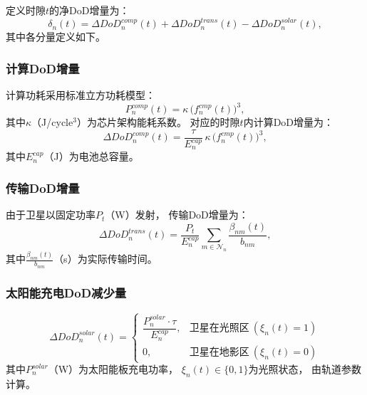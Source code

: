 \documentclass[a4paper,11pt]{article}
\begin{document}
定义时隙$t$的净DoD增量为：
\begin{equation}
    \delta_n(t) = \Delta DoD^{comp}_n(t)
    + \Delta DoD^{trans}_n(t)
    - \Delta DoD^{solar}_n(t),
    \label{eq:delta_dod}
\end{equation}
其中各分量定义如下。

\subsubsection{计算DoD增量}

计算功耗采用标准立方功耗模型\cite{zhang2024mhspo}：
\begin{equation}
    P^{comp}_n(t) = \kappa\,\big(f^{cmp}_n(t)\big)^3,
    \label{eq:comp_power}
\end{equation}
其中$\kappa$（J/cycle$^3$）为芯片架构能耗系数。
对应的时隙$t$内计算DoD增量为：
\begin{equation}
    \Delta DoD^{comp}_n(t) =
    \frac{\tau}{E^{cap}_n}\,\kappa\,\big(f^{cmp}_n(t)\big)^3,
    \label{eq:dod_comp}
\end{equation}
其中$E^{cap}_n$（J）为电池总容量。

\subsubsection{传输DoD增量}

由于卫星以固定功率$P_t$（W）发射，
传输DoD增量为：
\begin{equation}
    \Delta DoD^{trans}_n(t) =
    \frac{P_t}{E^{cap}_n} \sum_{m \in \mathcal{N}_n}
    \frac{\beta_{nm}(t)}{b_{nm}},
    \label{eq:dod_trans}
\end{equation}
其中$\frac{\beta_{nm}(t)}{b_{nm}}$（s）为实际传输时间。

\subsubsection{太阳能充电DoD减少量}

\begin{equation}
    \Delta DoD^{solar}_n(t) =
    \begin{cases}
        \dfrac{P^{solar}_n \cdot \tau}{E^{cap}_n},
            & \text{卫星在光照区}~(\xi_n(t)=1) \\[6pt]
        0,
            & \text{卫星在地影区}~(\xi_n(t)=0)
    \end{cases}
    \label{eq:dod_solar}
\end{equation}
其中$P^{solar}_n$（W）为太阳能板充电功率，
$\xi_n(t) \in \{0,1\}$为光照状态，
由轨道参数计算。
\end{document}
